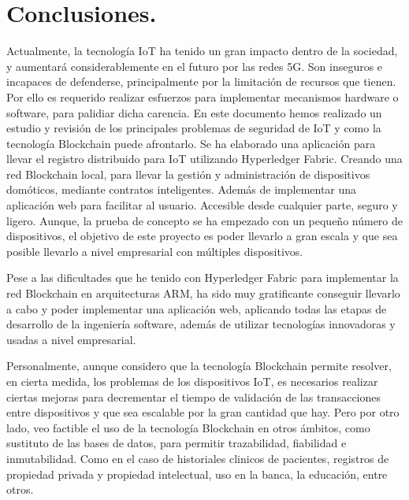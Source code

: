 \section{Conclusiones.}


Actualmente, la tecnología IoT ha tenido un gran impacto dentro de la sociedad, y aumentará considerablemente en el 
futuro por las redes 5G. Son inseguros e incapaces de defenderse, principalmente por la limitación de recursos que tienen. 
Por ello es requerido realizar esfuerzos para implementar mecanismos hardware o software, para palidiar dicha carencia. 
En este documento hemos realizado un estudio y revisión de los principales problemas de seguridad de IoT y como la 
tecnología Blockchain puede afrontarlo. Se ha elaborado una aplicación para llevar el registro distribuido para IoT 
utilizando Hyperledger Fabric. Creando una red Blockchain local, para llevar la gestión y administración de dispositivos 
domóticos, mediante contratos inteligentes. Además de implementar una aplicación web para facilitar al usuario. Accesible 
desde cualquier parte, seguro y ligero. Aunque, la prueba de concepto se ha empezado con un pequeño número de dispositivos,
el objetivo de este proyecto es poder llevarlo a gran escala y que sea posible llevarlo a nivel empresarial con múltiples
dispositivos.  

\vspace{5mm}

\noindent Pese a las dificultades que he tenido con Hyperledger Fabric para implementar la red Blockchain en arquitecturas 
ARM, ha sido muy gratificante conseguir llevarlo a cabo y poder implementar una aplicación web, aplicando todas las etapas 
de desarrollo de la ingeniería software, además de utilizar tecnologías innovadoras y usadas a nivel empresarial.

\vspace{5mm}

\noindent Personalmente, aunque considero que la tecnología Blockchain permite resolver, en cierta medida, los problemas 
de los dispositivos IoT, es necesarios realizar ciertas mejoras para decrementar el tiempo de validación de las 
transacciones entre dispositivos y que sea escalable por la gran cantidad que hay. Pero por otro lado, veo factible el uso 
de la tecnología Blockchain en otros ámbitos, como sustituto de las bases de datos, para permitir trazabilidad, fiabilidad 
e inmutabilidad. Como en el caso de historiales clinicos de pacientes, registros de propiedad privada y propiedad 
intelectual, uso en la banca, la educación, entre otros.

